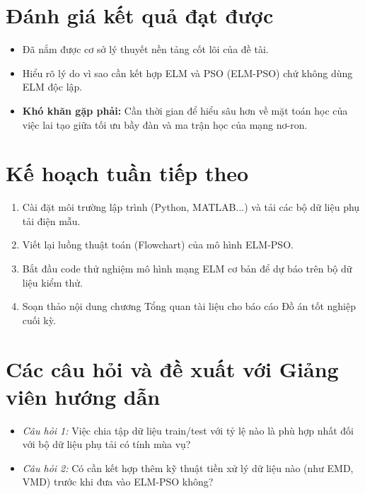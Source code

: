 \documentclass[12pt,a4paper]{article}
\begin{document}
\section{Đánh giá kết quả đạt được}
\begin{itemize}
    \item Đã nắm được cơ sở lý thuyết nền tảng cốt lõi của đề tài.
    \item Hiểu rõ lý do vì sao cần kết hợp ELM và PSO (ELM-PSO) chứ không dùng ELM độc lập.
    \item \textbf{Khó khăn gặp phải:} Cần thời gian để hiểu sâu hơn về mặt toán học của việc lai tạo giữa tối ưu bầy đàn và ma trận học của mạng nơ-ron.
\end{itemize}

\section{Kế hoạch tuần tiếp theo}
\begin{enumerate}
    \item Cài đặt môi trường lập trình (Python, MATLAB...) và tải các bộ dữ liệu phụ tải điện mẫu.
    \item Viết lại luồng thuật toán (Flowchart) của mô hình ELM-PSO.
    \item Bắt đầu code thử nghiệm mô hình mạng ELM cơ bản để dự báo trên bộ dữ liệu kiểm thử.
    \item Soạn thảo nội dung chương Tổng quan tài liệu cho báo cáo Đồ án tốt nghiệp cuối kỳ.
\end{enumerate}

\section{Các câu hỏi và đề xuất với Giảng viên hướng dẫn}
\begin{itemize}
    \item \textit{Câu hỏi 1:} Việc chia tập dữ liệu train/test với tỷ lệ nào là phù hợp nhất đối với bộ dữ liệu phụ tải có tính mùa vụ?
    \item \textit{Câu hỏi 2:} Có cần kết hợp thêm kỹ thuật tiền xử lý dữ liệu nào (như EMD, VMD) trước khi đưa vào ELM-PSO không?
\end{itemize}
\end{document}
